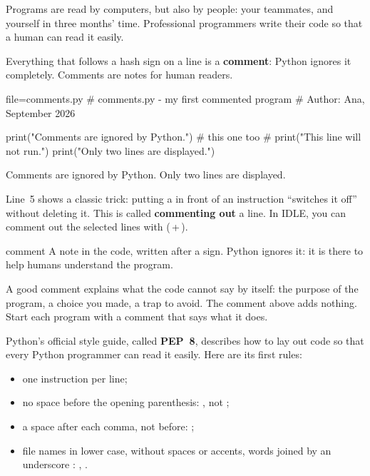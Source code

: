 
Programs are read by computers, but also by people: your teammates, and yourself in three months'
time. Professional programmers write their code so that a human can read it easily.

Everything that follows a hash sign \py{\#} on a line is a \textbf{comment}: Python ignores it
completely. Comments are notes for human readers.

\begin{code}{file=comments.py}
# comments.py - my first commented program
# Author: Ana, September 2026

print("Comments are ignored by Python.")  # this one too
# print("This line will not run.")
print("Only two lines are displayed.")
\end{code}
\begin{sortie}
Comments are ignored by Python.
Only two lines are displayed.
\end{sortie}

Line~5 shows a classic trick: putting a \py{\#} in front of an instruction \enquote{switches it
off} without deleting it. This is called \textbf{commenting out} a line. In IDLE, you can comment
out the selected lines with  (\,+\,).

\begin{definition}{comment}
A note in the code, written after a \py{\#} sign. Python ignores it: it is there to help humans
understand the program.
\end{definition}

\begin{pratique}
A good comment explains what the code cannot say by itself: the purpose of the program, a choice
you made, a trap to avoid. The comment  above  adds nothing.
Start each program with a comment that says what it does.
\end{pratique}

Python's official style guide, called \textbf{PEP~8}, describes how to lay out code so that every
Python programmer can read it easily. Here are its first rules:

\begin{itemize}
\item one instruction per line;
\item no space before the opening parenthesis: , not ;
\item a space after each comma, not before: ;
\item file names in lower case, without spaces or accents, words joined by an underscore
  \py{\_}: , .
\end{itemize}

